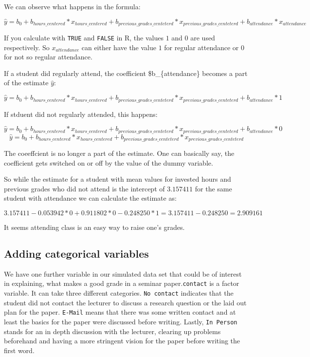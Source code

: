 \documentclass[
]{book}
\begin{document}
We can observe what happens in the formula:

\[\hat{y} = b_0 + b_{hours\_centered}*x_{hours\_centered} + b_{previous\_grades\_centeterd}*x_{previous\_grades\_centeterd} + b_{attendance} * x_{attendance}\]

If you calculate with \texttt{TRUE} and \texttt{FALSE} in R, the values \(1\) and \(0\) are used
respectively. So \(x_{attendance}\) can either have the value \(1\) for regular
attendance or \(0\) for not so regular attendance.

If a student did regularly attend, the coefficient \$b\_\{attendance\} becomes a
part of the estimate \(\hat{y}\):

\[\hat{y} = b_0 + b_{hours\_centered}*x_{hours\_centered} + b_{previous\_grades\_centeterd}*x_{previous\_grades\_centeterd} + b_{attendance} * 1\]

If stduent did not regularly attended, this happens:

\[\hat{y} = b_0 + b_{hours\_centered}*x_{hours\_centered} + b_{previous\_grades\_centeterd}*x_{previous\_grades\_centeterd} + b_{attendance} * 0\]
\[\hat{y} = b_0 + b_{hours\_centered}*x_{hours\_centered} + b_{previous\_grades\_centeterd}*x_{previous\_grades\_centeterd}\]

The coeeffcient is no longer a part of the estimate. One can basically say, the
coefficient gets switched on or off by the value of the dummy variable.

So while the estimate for a student with mean values for invested hours and
previous grades who did not attend is the intercept of \(3.157411\) for the same
student with attendance we can calculate the estimate as:

\[3.157411 - 0.053942*0 + 0.911802*0 - 0.248250 * 1 = 3.157411 - 0.248250 = 2.909161\]

It seems attending class is an easy way to raise one's grades.

\hypertarget{adding-categorical-variables}{%
\subsection{Adding categorical variables}\label{adding-categorical-variables}}

We have one further variable in our simulated data set that could be of interest
in explaining, what makes a good grade in a seminar paper.\texttt{contact} is a factor
variable. It can take three different categories. \texttt{No\ contact} indicates that
the student did not contact the lecturer to discuss a research question or the
laid out plan for the paper. \texttt{E-Mail} means that there was some written contact
and at least the basics for the paper were discussed before writing. Lastly,
\texttt{In\ Person} stands for an in depth discussion with the lecturer, clearing up
problems beforehand and having a more stringent vision for the paper before
writing the first word.
\end{document}
